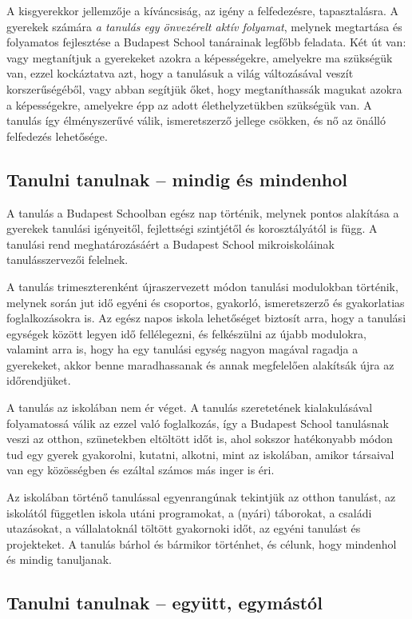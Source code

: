 A kisgyerekkor jellemzője a kíváncsiság, az igény a felfedezésre, tapasztalásra. A gyerekek számára  \emph{a tanulás  egy önvezérelt aktív folyamat}, melynek megtartása és folyamatos fejlesztése a Budapest School tanárainak legfőbb feladata. Két út van: vagy megtanítjuk a gyerekeket azokra a képességekre, amelyekre ma szükségük van, ezzel kockáztatva azt, hogy a tanulásuk a világ változásával veszít korszerűségéből, vagy abban segítjük őket, hogy megtaníthassák magukat azokra a képességekre, amelyekre épp az adott élethelyzetükben szükségük van. A tanulás így élményszerűvé válik, ismeretszerző jellege csökken, és nő az önálló felfedezés lehetősége.

\subsection{Tanulni tanulnak -- mindig és mindenhol}
A tanulás a Budapest Schoolban egész nap történik, melynek pontos alakítása a gyerekek tanulási igényeitől, fejlettségi szintjétől és korosztályától is függ. A tanulási rend meghatározásáért a Budapest School mikroiskoláinak tanulásszervezői felelnek.

A tanulás trimeszterenként újraszervezett módon tanulási modulokban történik, melynek során jut idő egyéni és csoportos, gyakorló, ismeretszerző és gyakorlatias foglalkozásokra is. Az egész napos iskola lehetőséget biztosít arra, hogy a tanulási egységek között legyen idő fellélegezni, és felkészülni az újabb modulokra, valamint arra is, hogy ha egy tanulási egység nagyon magával ragadja a gyerekeket, akkor benne maradhassanak és annak megfelelően alakítsák újra az időrendjüket.

A tanulás az iskolában nem ér véget. A tanulás szeretetének kialakulásával folyamatossá válik az ezzel való foglalkozás, így a Budapest School tanulásnak veszi az otthon, szünetekben eltöltött időt is, ahol sokszor hatékonyabb módon tud egy gyerek gyakorolni, kutatni, alkotni, mint az iskolában, amikor társaival van egy közösségben és ezáltal számos más inger is éri.

Az iskolában történő tanulással egyenrangúnak tekintjük az otthon tanulást, az iskolától független iskola utáni programokat, a (nyári) táborokat, a családi utazásokat, a vállalatoknál töltött gyakornoki időt, az egyéni tanulást és projekteket. A tanulás bárhol és bármikor történhet, és célunk, hogy mindenhol és mindig tanuljanak.

\subsection{Tanulni tanulnak -- együtt, egymástól}

